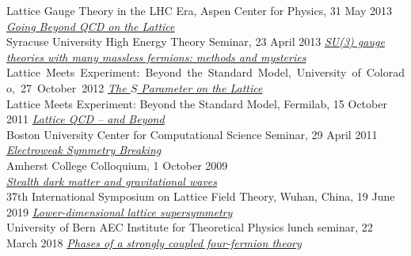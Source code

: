 \begin{spacelist}
\begin{revnumerate}
      Lattice Gauge Theory in the LHC Era, Aspen Center for Physics, 31 May 2013
    \pagebreakitem
      \textit{\href{http://www.davidschaich.net/talks/SU1304.pdf}{Going Beyond QCD on the Lattice}} \\
      Syracuse University High Energy Theory Seminar, 23 April 2013
    \pagebreakitem
      \textit{\href{http://www.davidschaich.net/talks/LME2012.pdf}{SU(3) gauge theories with many massless fermions: methods and mysteries}} \\
      Lattice~Meets~Experiment:~Beyond~the~Standard~Model,~University~of~Colorado,~27~October~2012
    \pagebreakitem
      \textit{\href{http://www.davidschaich.net/talks/LME2011.pdf}{The $S$ Parameter on the Lattice}} \\
      Lattice Meets Experiment: Beyond the Standard Model, Fermilab, 15 October 2011
    \pagebreakitem
      \textit{\href{http://www.davidschaich.net/talks/1104CCS.pdf}{Lattice QCD -- and Beyond}} \\
      Boston University Center for Computational Science Seminar, 29 April 2011
    \pagebreakitem
      \textit{\href{http://www.davidschaich.net/talks/EWSB.pdf}{Electroweak Symmetry Breaking}} \\
      Amherst College Colloquium, 1 October 2009 \\
%
%
%
\vspace{18 pt}
\hspace{-22 pt}{\large \bfseries Contributed talks} \vspace{-8 pt}
    \pagebreakitem
      \textit{\href{http://www.davidschaich.net/talks/1906Lattice.pdf}{Stealth dark matter and gravitational waves}} \\
      37th International Symposium on Lattice Field Theory, Wuhan, China, 19 June 2019
    \pagebreakitem
      \textit{\href{http://www.davidschaich.net/talks/1803Bern.pdf}{Lower-dimensional lattice supersymmetry}} \\
      University of Bern AEC Institute for Theoretical Physics lunch seminar, 22 March 2018
    \pagebreakitem
      \textit{\href{http://www.davidschaich.net/talks/lattice17.pdf}{Phases of a strongly coupled four-fermion theory}} \\

\end{revnumerate}
\end{spacelist}
